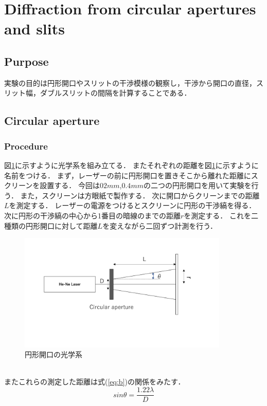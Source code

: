 \documentclass[11pt, a4paper]{jsarticle}
\begin{document}
\section{Diffraction from circular apertures and slits}
\subsection*{Purpose}
実験の目的は円形開口やスリットの干渉模様の観察し，干渉から開口の直径，スリット幅，ダブルスリットの間隔を計算することである．
\subsection{Circular aperture}
\subsubsection{Procedure}
図\ref{fig:five}に示すように光学系を組み立てる．
またそれぞれの距離を図\ref{fig:five}に示すように名前をつける．
まず，レーザーの前に円形開口を置きそこから離れた距離にスクリーンを設置する．
今回は$02mm$,$0.4mm$の二つの円形開口を用いて実験を行う．
また，スクリーンは方眼紙で製作する．
次に開口からクリーンまでの距離$L$を測定する．
レーザーの電源をつけるとスクリーンに円形の干渉縞を得る．
次に円形の干渉縞の中心から1番目の暗線のまでの距離$r$を測定する．
これを二種類の円形開口に対して距離$L$を変えながら二回ずつ計測を行う．
\begin{figure}[htbp]
 \begin{center}
  \includegraphics[width=100mm]{fig5.png}
 \end{center}
 \caption{円形開口の光学系}
 \label{fig:five}
\end{figure}\\

またこれらの測定した距離は式(\ref{eq:b})の関係をみたす．
\begin{equation}
    sin\theta = \frac{1.22\lambda}{D} \label{eq:b}
\end{equation}\\
\end{document}
